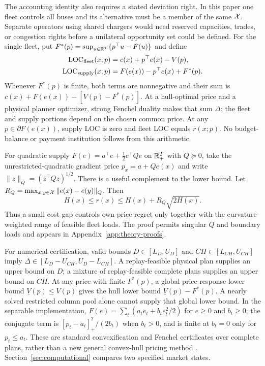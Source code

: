 The accounting identity also requires a stated deviation right.  In this
paper one fleet controls all buses and its alternative must be a member of
the same $\mathcal X$.  Separate operators using shared chargers would need
reserved capacities, trades, or congestion rights before a unilateral
opportunity set could be defined.  For the single fleet, put
$F^*(p)=\sup_{u\in\mathbb R^T}\{p^\top u-F(u)\}$ and define
\begin{align}\label{eq:theory-loc}
 \mathrm{LOC}_{\rm fleet}(x;p)&=c(x)+p^\top e(x)-V(p),\\
 \mathrm{LOC}_{\rm supply}(x;p)&=F(e(x))-p^\top e(x)+F^*(p).
\end{align}
Whenever $F^*(p)$ is finite, both terms are nonnegative and their sum is
$c(x)+F(e(x))-[V(p)-F^*(p)]$.  At a hull-optimal price and a physical planner
optimizer, strong Fenchel duality makes that sum $\Delta$; the fleet and
supply portions depend on the chosen common price.  At any
$p\in\partial F(e(x))$, supply LOC is zero and fleet LOC equals $r(x;p)$.
No budget-balance or payment institution
follows from this arithmetic.

For quadratic supply $F(e)=a^\top e+\tfrac12 e^\top Qe$ on $\mathbb R_+^T$ with
$Q\succeq0$, take the unrestricted-quadratic gradient price
$p_x=a+Qe(x)$ and
write $\|z\|_Q=(z^\top Qz)^{1/2}$.  There is a useful complement
to the lower bound.  Let
$R_Q=\max_{x,y\in\mathcal X}\|e(x)-e(y)\|_Q$. Then
\begin{equation}\label{eq:theory-upper}
 H(x)\leq r(x)\leq H(x)+R_Q\sqrt{2H(x)}.
\end{equation}
Thus a small cost gap controls own-price regret only together with the
curvature-weighted range of feasible fleet loads.  The proof permits singular
$Q$ and boundary loads and appears in Appendix~\ref{app:theory-proofs}.

For numerical certification, valid bounds
$D\in[L_D,U_D]$ and $CH\in[L_{CH},U_{CH}]$ imply
$\Delta\in[L_D-U_{CH},U_D-L_{CH}]$.  A replay-feasible physical plan supplies
an upper bound on $D$; a mixture of replay-feasible complete plans supplies
an upper bound on $CH$.  At any price with finite $F^*(p)$, a global
price-response lower bound $\underline V(p)\leq V(p)$ gives the hull lower
bound $\underline V(p)-F^*(p)$.  A nearly solved restricted column pool alone
cannot supply that global lower bound.  In the separable implementation,
$F(e)=\sum_t(a_te_t+b_te_t^2/2)$ for $e\geq0$ and $b_t\geq0$;
the conjugate term is
$[p_t-a_t]_+^2/(2b_t)$ when $b_t>0$, and is finite at $b_t=0$ only for
$p_t\leq a_t$.  These are standard convexification and Fenchel certificates
over complete plans, rather than a new general convex-hull pricing method
\citep{huaBaldick2017}.  Section~\ref{sec:computational} compares two specified market states.

